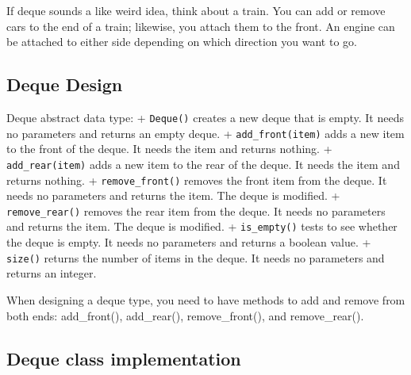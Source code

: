 \documentclass[
  letterpaper,
]{scrbook}
\begin{document}
If deque sounds a like weird idea, think about a train. You can add or
remove cars to the end of a train; likewise, you attach them to the
front. An engine can be attached to either side depending on which
direction you want to go.

\subsection*{Deque Design}\label{deque-design}

Deque abstract data type: + \texttt{Deque()} creates a new deque that is
empty. It needs no parameters and returns an empty deque. +
\texttt{add\_front(item)} adds a new item to the front of the deque. It
needs the item and returns nothing. + \texttt{add\_rear(item)} adds a
new item to the rear of the deque. It needs the item and returns
nothing. + \texttt{remove\_front()} removes the front item from the
deque. It needs no parameters and returns the item. The deque is
modified. + \texttt{remove\_rear()} removes the rear item from the
deque. It needs no parameters and returns the item. The deque is
modified. + \texttt{is\_empty()} tests to see whether the deque is
empty. It needs no parameters and returns a boolean value. +
\texttt{size()} returns the number of items in the deque. It needs no
parameters and returns an integer.

When designing a deque type, you need to have methods to add and remove
from both ends: add\_front(), add\_rear(), remove\_front(), and
remove\_rear().

\subsection*{Deque class
implementation}\label{deque-class-implementation}
\end{document}

